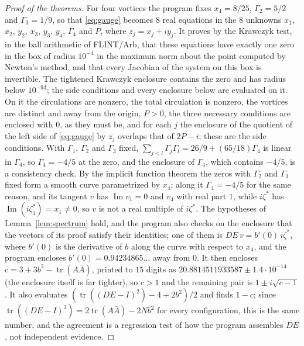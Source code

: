 \documentclass[11pt]{article}
\theoremstyle{definition}
\newcommand{\im}{\operatorname{Im}}
\newcommand{\tr}{\operatorname{tr}}
\begin{document}
\begin{proof}[Proof of the theorems]
For four vortices the program fixes $x_4 = 8/25$, $\Gamma_2 = 5/2$ and $\Gamma_3 = 1/9$, so that \eqref{eq:gauge} becomes $8$ real equations in the $8$ unknowns $x_1$, $x_2$, $y_2$, $x_3$, $y_3$, $y_4$, $\Gamma_4$ and $P$, where $z_j = x_j + iy_j$. It proves by the Krawczyk test, in the ball arithmetic of FLINT/Arb, that these equations have exactly one zero in the box of radius $10^{-4}$ in the maximum norm about the point computed by Newton's method, and that every Jacobian of the system on this box is invertible. The tightened Krawczyk enclosure contains the zero and has radius below $10^{-93}$; the side conditions and every enclosure below are evaluated on it. On it the circulations are nonzero, the total circulation is nonzero, the vortices are distinct and away from the origin, $P > 0$, the three necessary conditions are enclosed with $0$, as they must be, and for each $j$ the enclosure of the quotient of the left side of \eqref{eq:gauge} by $\overline{z_j}$ overlaps that of $2P - i$; these are the side conditions. With $\Gamma_1$, $\Gamma_2$ and $\Gamma_3$ fixed, $\sum_{j<l}\Gamma_j\Gamma_l = 26/9 + (65/18)\Gamma_4$ is linear in $\Gamma_4$, so $\Gamma_4 = -4/5$ at the zero, and the enclosure of $\Gamma_4$, which contains $-4/5$, is a consistency check. By the implicit function theorem the zeros with $\Gamma_2$ and $\Gamma_3$ fixed form a smooth curve parametrized by $x_4$; along it $\Gamma_4 = -4/5$ for the same reason, and its tangent $v$ has $\im v_1 = 0$ and $v_4$ with real part $1$, while $i\zeta^*$ has $\im(i\zeta_1^*) = x_1 \ne 0$, so $v$ is not a real multiple of $i\zeta^*$. The hypotheses of Lemma~\ref{lem:spectrum} hold, and the program also checks on the enclosure that the vectors of its proof satisfy their identities; one of them is $DE\,v = b'(0)\,i\zeta^*$, where $b'(0)$ is the derivative of $b$ along the curve with respect to $x_4$, and the program encloses $b'(0) = 0.94234865\ldots$ away from $0$. It then encloses $c = 3 + 3b^2 - \tr(A\bar A)$, printed to $15$ digits as $20.8814511933587 \pm 1.4\cdot10^{-14}$ (the enclosure itself is far tighter), so $c > 1$ and the remaining pair is $1 \pm i\sqrt{c - 1}$. It also evaluates $(\tr((DE - I)^2) - 4 + 2b^2)/2$ and finds $1 - c$; since $\tr((DE - I)^2) = 2\tr(A\bar A) - 2Nb^2$ for every configuration, this is the same number, and the agreement is a regression test of how the program assembles $DE$, not independent evidence.


\end{proof}
\end{document}
